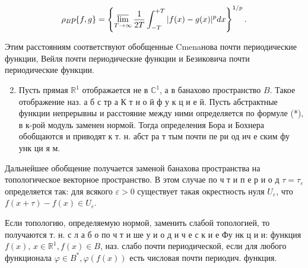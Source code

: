 \documentclass[10pt]{article}
\begin{document}
\[

\rho_{B} p\{f, g\}=\left\{\varlimsup_{T \rightarrow \infty} \frac{1}{2 T} \int_{-T}^{+T}|f(x)-g(x)|^{p} d x\right\}^{1 / p} .

\]



Этим расстояниям соответствуют обобщенные Cmenaнова почти периодические функции, Вейля почти периодические функции и Безиковича почти периодические функции.



\begin{enumerate}

  \setcounter{enumi}{1}

  \item Пусть прямая $\mathbb{R}^{1}$ отображается не в $\mathbb{C}^{1}$, а в банахово пространство $B$. Такое отображение наз. а б с тр а К т н о й ф у к ц и е й. Пусть абстрактные функции непрерывны и расстояние между ними определяется по формуле (*), в к-рой модуль заменен нормой. Тогда определения Бора и Бохнера обобщаются и приводят к т. н. абст ра т тым почти пе ри од ич е ским фу унк ци я м.

\end{enumerate}



Дальнейшее обобщение получается заменой банахова пространства на топологическое векторное пространство. В этом случае по ч т и п е р и о д $\tau=\tau_{\varepsilon}$ определяется так: для всякого $\varepsilon>0$ существует такая окрестность нуля $U_{\varepsilon}$, что $f(x+\tau)-f(x) \in U_{\varepsilon}$.



Если топологию, определяемую нормой, заменить слабой топологией, то получаются т. н. с л а б о по ч т и ше у и о д и ч е с к и е Фу нк ц и и: функция $f(x)$, $x \in \mathbb{R}^{1}, f(x) \in B$, наз. слабо почти периодической, если для любого функционала $\varphi \in B^{*}, \varphi(f(x))$ есть числовая почти периодич. функция.
\end{document}
